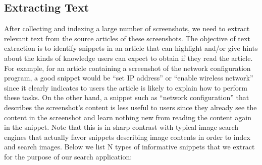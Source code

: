 \documentclass{www2010-submission}
\begin{document}
\subsection{Extracting Text}

After collecting and indexing a large number of screenshots, we need
to extract relevant text from the source articles of these
screenshots. The objective of text extraction is to identify snippets
in an article that can highlight and/or give hints about the kinds of
knowledge users can expect to obtain if they read the article. For
example, for an article containing a screenshot of the network
configuration program, a good snippet would be ``set IP address'' or
``enable wireless network'' since it clearly indicates to users the
article is likely to explain how to perform these tasks. On the other
hand, a snippet such as ``network configuration'' that describes the
screenshot's content is less useful to users since they already see
the content in the screenshot and learn nothing new from reading the
content again in the snippet. Note that this is in sharp contrast with
typical image search engines that actually favor snippets describing
image contents in order to index and search images. Below we list N
types of informative snippets that we extract for the purpose of our 
search application:
\end{document}

